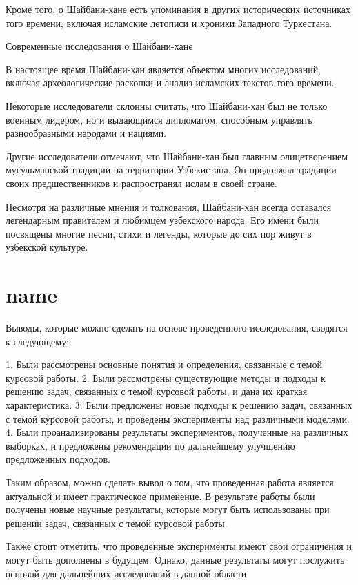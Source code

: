 \documentclass[draft]{article}
\begin{document}
Кроме того, о Шайбани-хане есть упоминания в других исторических источниках того времени, включая исламские летописи и хроники Западного Туркестана.

Современные исследования о Шайбани-хане

В настоящее время Шайбани-хан является объектом многих исследований, включая археологические раскопки и анализ исламских текстов того времени.

Некоторые исследователи склонны считать, что Шайбани-хан был не только военным лидером, но и выдающимся дипломатом, способным управлять разнообразными народами и нациями.

Другие исследователи отмечают, что Шайбани-хан был главным олицетворением мусульманской традиции на территории Узбекистана. Он продолжал традиции своих предшественников и распространял ислам в своей стране.

Несмотря на различные мнения и толкования, Шайбани-хан всегда оставался легендарным правителем и любимцем узбекского народа. Его имени были посвящены многие песни, стихи и легенды, которые до сих пор живут в узбекской культуре.\newpage\section{name}
Выводы, которые можно сделать на основе проведенного исследования, сводятся к следующему:

1. Были рассмотрены основные понятия и определения, связанные с темой курсовой работы.
2. Были рассмотрены существующие методы и подходы к решению задач, связанных с темой курсовой работы, и дана их краткая характеристика.
3. Были предложены новые подходы к решению задач, связанных с темой курсовой работы, и проведены эксперименты над различными моделями.
4. Были проанализированы результаты экспериментов, полученные на различных выборках, и предложены рекомендации по дальнейшему улучшению предложенных подходов.

Таким образом, можно сделать вывод о том, что проведенная работа является актуальной и имеет практическое применение. В результате работы были получены новые научные результаты, которые могут быть использованы при решении задач, связанных с темой курсовой работы. 

Также стоит отметить, что проведенные эксперименты имеют свои ограничения и могут быть дополнены в будущем. Однако, данные результаты могут послужить основой для дальнейших исследований в данной области.
\end{document}
